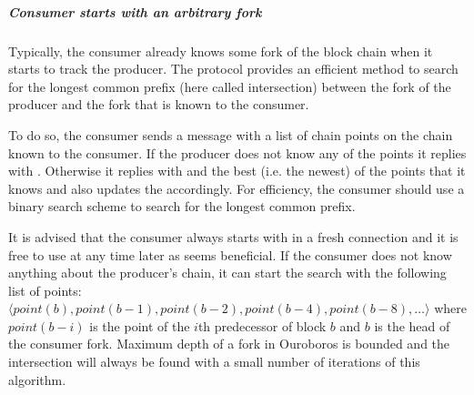 \subparagraph{Consumer starts with an arbitrary fork}
Typically, the consumer already knows some fork of the block chain when it
starts to track the producer.
The protocol provides an efficient method to search for the longest common prefix (here called intersection)
between the fork of the producer and the fork that is known to the consumer.

To do so, the consumer sends a \FindIntersect{} message with a list of chain
points on the chain known to the consumer.
If the producer does not know any of the points it replies with \IntersectNotFound.
Otherwise it replies with \IntersectFound{} and the best (i.e. the newest) of the points that it knows
and also updates the \readpointer{} accordingly.
For efficiency, the consumer should use a binary search scheme to search for the longest common
prefix.

It is advised that the consumer always starts with \FindIntersect{} in a fresh connection
and it is free to use \FindIntersect{} at any time later as seems beneficial.
If the consumer does not know anything about the producer's chain,
it can start the search with the following list of points:
$\langle point(b), point(b-1), point(b-2), point(b-4), point (b-8),\ldots \rangle$
where $point(b-i)$ is the point of the $i$th predecessor of block $b$ and
$b$ is the head of the consumer fork.
Maximum depth of a fork in Ouroboros is bounded and the intersection will always be found with a small number of
iterations of this algorithm.

